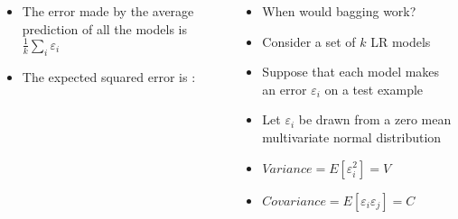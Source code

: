 \begin{frame}
	\begin{columns}
		\begin{overlayarea}{\textwidth}{\textheight}
			\begin{itemize}
				\item <7-> The error made by the average prediction of all the models is $\frac{1}{k}\sum_{i}\varepsilon_i$
				\item <8-> The expected squared error is :
			\end{itemize}
		\end{overlayarea}
		\begin{overlayarea}{\textwidth}{\textheight}
			\begin{itemize}
				\justifying
				\item<1->  When would bagging work?
				\item<2-> Consider a set of $k$ LR models
				\item<3->  Suppose that each model makes an error $\varepsilon_i$ on a test example
				\item<4->  Let $\varepsilon_i$ be drawn from a zero mean multivariate normal distribution
				\item<5->  $ Variance = E[\varepsilon_i^{2}]=V$
				\item<6->  $Covariance = E[\varepsilon_i \varepsilon_j]=C$
			\end{itemize}
		\end{overlayarea}
	\end{columns}
\end{frame}


